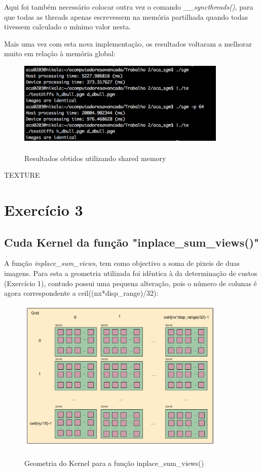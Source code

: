 \documentclass[pdftex,12pt,a4paper]{report}
\begin{document}
Aqui foi também necessário colocar outra vez o comando \textit{\_\_syncthreads()}, para que todas as threads apenas escrevessem na memória partilhada quando todas tivessem calculado o mínimo valor nesta.

Mais uma vez com esta nova implementação, os resultados voltaram a melhorar muito em relação à memória global:

\begin{figure}[!htb]
\center
 \includegraphics[width=100mm,scale=1]{IteratePositionShared.png}
 \caption{\\ Resultados obtidos utilizando shared memory}
 \label{fig:IteratePositionShared}
\end{figure}

TEXTURE

\newpage
\section{Exercício 3}

\subsection{Cuda Kernel da função "inplace\_sum\_views()"}

A função \textit{inplace\_sum\_views}, tem como objectivo a soma de pixeis de duas imagens. Para esta a geometria utilizada foi idêntica à da determinação de custos (Exercício 1), contudo possui uma pequena alteração, pois o número de colunas é agora correspondente a ceil((nx*disp\_range)/32):

\begin{figure}[!htb]
\center
 \includegraphics[width=100mm,scale=1]{InplaceSumViews_v1_kernel.pdf}
 \caption{\\ Geometria do Kernel para a função inplace\_sum\_views()}
 \label{fig:InplaceSumViews_v1_kernel}
\end{figure}
\end{document}
